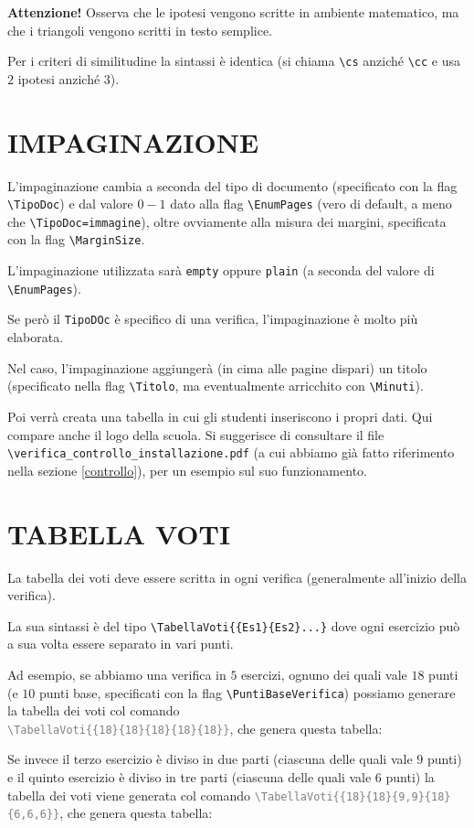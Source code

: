 \documentclass[italian, a4paper]{article}
\newcommand{\bs}{\textbackslash}
\newcommand{\ttt}[1]{\texttt{#1}}
\begin{document}
\textbf{Attenzione!} Osserva che le ipotesi vengono scritte in ambiente matematico, ma che i triangoli vengono scritti in testo semplice.

Per i criteri di similitudine la sintassi è identica (si chiama \ttt{\bs cs} anziché \ttt{\bs cc} e usa $2$ ipotesi anziché $3$).

\section{IMPAGINAZIONE}
L'impaginazione cambia a seconda del tipo di documento (specificato con la flag \ttt{\bs TipoDoc}) e dal valore $0-1$ dato alla flag \ttt{\bs EnumPages} (vero di default, a meno che \ttt{\bs TipoDoc=immagine}), oltre ovviamente alla misura dei margini, specificata con la flag \ttt{\bs MarginSize}.

L'impaginazione utilizzata sarà \ttt{empty} oppure \ttt{plain} (a seconda del valore di \ttt{\bs EnumPages}).

Se però il \ttt{TipoDOc} è specifico di una verifica, l'impaginazione è molto più elaborata.

Nel caso, l'impaginazione aggiungerà (in cima alle pagine dispari) un titolo (specificato nella flag \ttt{\bs Titolo}, ma eventualmente arricchito con \ttt{\bs Minuti}).

Poi verrà creata una tabella in cui gli studenti inseriscono i propri dati. Qui compare anche il logo della scuola. Si suggerisce di consultare il file \ttt{\bs verifica\_controllo\_installazione.pdf} (a cui abbiamo già fatto riferimento nella sezione \ref{controllo}), per un esempio sul suo funzionamento.

\section{TABELLA VOTI}
La tabella dei voti deve essere scritta in ogni verifica (generalmente all'inizio della verifica).

La sua sintassi è del tipo \ttt{\bs TabellaVoti\{\{Es1\}\{Es2\}...\}} dove ogni esercizio può a sua volta essere separato in vari punti.

Ad esempio, se abbiamo una verifica in $5$ esercizi, ognuno dei quali vale $18$ punti (e $10$ punti base, specificati con la flag \ttt{\bs PuntiBaseVerifica}) possiamo generare la tabella dei voti col comando\\\textcolor{gray}{\ttt{\bs TabellaVoti\{\{18\}\{18\}\{18\}\{18\}\{18\}\}}}, che genera questa tabella:


Se invece il terzo esercizio è diviso in due parti (ciascuna delle quali vale $9$ punti) e il quinto esercizio è diviso in tre parti (ciascuna delle quali vale $6$ punti) la tabella dei voti viene generata col comando \textcolor{gray}{\ttt{\bs TabellaVoti\{\{18\}\{18\}\{9,9\}\{18\}\{6,6,6\}\}}}, che genera questa tabella:

\end{document}
